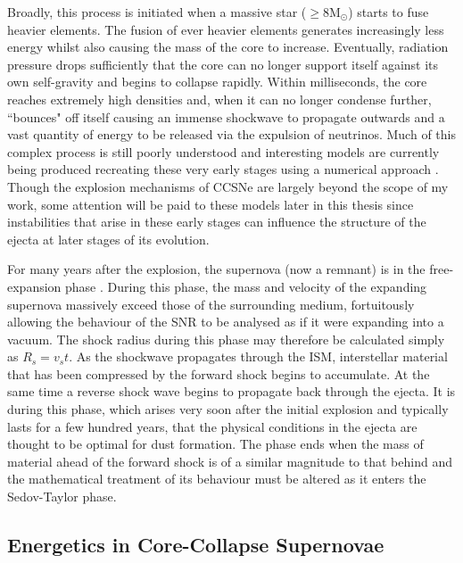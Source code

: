 Broadly, this process is initiated when a massive star ($\ge 8$M$_{\odot}$) starts to fuse heavier elements. The fusion of ever heavier elements generates increasingly less energy whilst also causing the mass of the core to increase.  Eventually, radiation pressure drops sufficiently that the core can no longer support itself against its own self-gravity and begins to collapse rapidly. Within milliseconds, the core reaches extremely high densities and, when it can no longer condense further, ``bounces" off itself causing  an immense shockwave to propagate outwards and a vast quantity of energy to be released via the expulsion of neutrinos.  Much of this complex process is still poorly understood and interesting models are currently being produced recreating these very early stages using a numerical approach \citep{Hammer2010,Takiwaki2014,Wongwathanarat2015}.  Though the explosion mechanisms of CCSNe are largely beyond the scope of my work, some attention will be paid to these models later in this thesis since instabilities that arise in these early stages can influence the structure of the ejecta at later stages of its evolution.

For many years after the explosion, the supernova (now a remnant) is in the free-expansion phase \citep{Landau1959,Ostriker1988}. During this phase, the mass and velocity of the expanding supernova massively exceed those of the surrounding medium, fortuitously allowing the behaviour of the SNR to be analysed as if it were expanding into a vacuum.  The shock radius during this phase may therefore be calculated simply as $R_s = v_s t$.  As the shockwave propagates through the ISM, interstellar material that has been compressed by the forward shock begins to accumulate.  At the same time a reverse shock wave begins to propagate back through the ejecta.  It is during this phase, which arises very soon after the initial explosion and typically lasts for a few hundred years, that the physical conditions in the ejecta are thought to be optimal for dust formation.  The phase ends when the mass of material ahead of the forward shock is of a similar magnitude to that behind and the mathematical treatment of its behaviour must be altered as it enters the Sedov-Taylor phase.
 

 
 \subsection{Energetics in Core-Collapse Supernovae}

